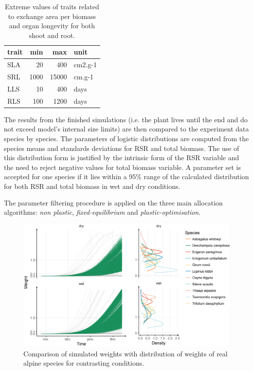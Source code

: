 \begin{table}[]
\centering
\caption{Extreme values of traits related to exchange area per biomass and organ longevity for both shoot and root.}
\label{table:boundaries}
\begin{tabular}{lrrl}
trait & min  & max   & unit    \\ \hline
SLA   & 20   & 400   & cm2.g-1 \\
SRL   & 1000 & 15000 & cm.g-1  \\
LLS   & 10   & 400   & days    \\
RLS   & 100  & 1200  & days   
\end{tabular}
\end{table}


The results from the finished simulations (i.e. the plant lives until the end and do not exceed model's internal size limits) are then compared to the experiment data species by species. The parameters of logistic distributions are computed from the species means and standards deviations for RSR and total biomass. The use of this distribution form is justified by the intrinsic form of the RSR variable and the need to reject negative values for total biomass variable. A parameter set is accepted for one species if it lies within a 95\% range of the calculated distribution for both RSR and total biomass in wet and dry conditions.

The parameter filtering procedure is applied on the three main allocation algorithms: \textit{non plastic}, \textit{fixed-equilibrium} and \textit{plastic-optimisation}.

\begin{figure}\label{fig:comparison_BM}
\includegraphics[width = \textwidth]{./2_PP/Figures/Calibration/weight_full_sim.png}
\caption{Comparison of simulated weights with distribution of weights of real alpine species for contrasting conditions.}
\end{figure}

